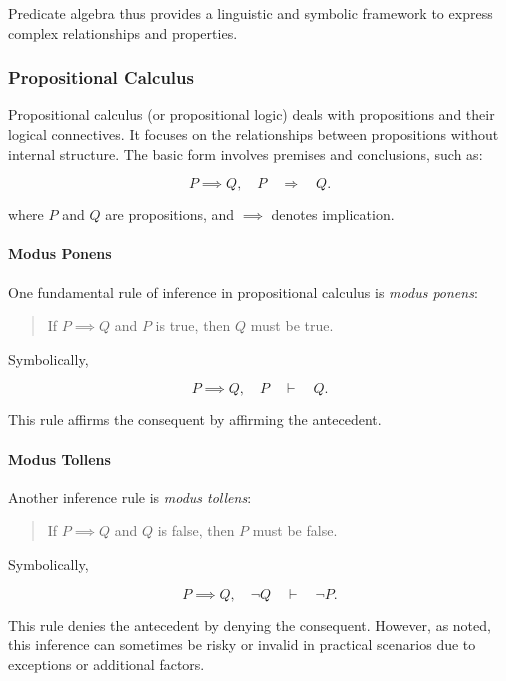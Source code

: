 Predicate algebra thus provides a linguistic and symbolic framework to express complex relationships and properties.

\subsubsection{Propositional Calculus}
\label{sec:softcomp_propositional_calculus_sub}

Propositional calculus (or propositional logic) deals with propositions and their logical connectives. It focuses on the relationships between propositions without internal structure. The basic form involves premises and conclusions, such as:

\[
P \implies Q, \quad P \quad \Rightarrow \quad Q.
\]

where $P$ and $Q$ are propositions, and $\implies$ denotes implication.

\paragraph{Modus Ponens}

One fundamental rule of inference in propositional calculus is \emph{modus ponens}:

\begin{quote}
If $P \implies Q$ and $P$ is true, then $Q$ must be true.
\end{quote}

Symbolically,

\[
P \implies Q, \quad P \quad \vdash \quad Q.
\]

This rule affirms the consequent by affirming the antecedent.

\paragraph{Modus Tollens}

Another inference rule is \emph{modus tollens}:

\begin{quote}
If $P \implies Q$ and $Q$ is false, then $P$ must be false.
\end{quote}

Symbolically,

\[
P \implies Q, \quad \neg Q \quad \vdash \quad \neg P.
\]

This rule denies the antecedent by denying the consequent. However, as noted, this inference can sometimes be risky or invalid in practical scenarios due to exceptions or additional factors.


